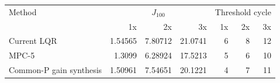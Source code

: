 \begin{tabular}{lrrrrrr}
\toprule
Method & \multicolumn{3}{c}{$J_{100}$} & \multicolumn{3}{c}{Threshold cycle} \\
 & 1x & 2x & 3x & 1x & 2x & 3x \\
\midrule
Current LQR & 1.54565 & 7.80712 & 21.0741 & 6 & 8 & 12 \\
MPC-5 & 1.3099 & 6.28924 & 17.5213 & 5 & 6 & 10 \\
Common-P gain synthesis & 1.50961 & 7.54651 & 20.1221 & 4 & 7 & 11 \\
\bottomrule
\end{tabular}
